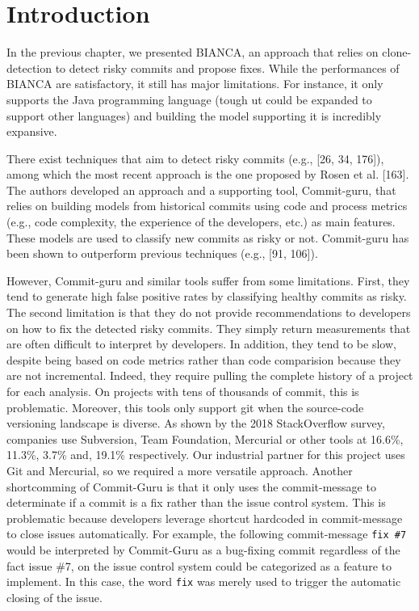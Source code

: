 \documentclass[12pt]{report}
\begin{document}
\section{Introduction}\label{introduction-4}

In the previous chapter, we presented BIANCA, an approach that relies on
clone-detection to detect risky commits and propose fixes. While the
performances of BIANCA are satisfactory, it still has major limitations.
For instance, it only supports the Java programming language (tough ut
could be expanded to support other languages) and building the model
supporting it is incredibly expansive.

There exist techniques that aim to detect risky commits (e.g., {[}26,
34, 176{]}), among which the most recent approach is the one proposed by
Rosen et al. {[}163{]}. The authors developed an approach and a
supporting tool, Commit-guru, that relies on building models from
historical commits using code and process metrics (e.g., code
complexity, the experience of the developers, etc.) as main features.
These models are used to classify new commits as risky or not.
Commit-guru has been shown to outperform previous techniques (e.g.,
{[}91, 106{]}).

However, Commit-guru and similar tools suffer from some limitations.
First, they tend to generate high false positive rates by classifying
healthy commits as risky. The second limitation is that they do not
provide recommendations to developers on how to fix the detected risky
commits. They simply return measurements that are often difficult to
interpret by developers. In addition, they tend to be slow, despite
being based on code metrics rather than code comparision because they
are not incremental. Indeed, they require pulling the complete history
of a project for each analysis. On projects with tens of thousands of
commit, this is problematic. Moreover, this tools only support git when
the source-code versioning landscape is diverse. As shown by the 2018
StackOverflow survey, companies use Subversion, Team Foundation,
Mercurial or other tools at 16.6\%, 11.3\%, 3.7\% and, 19.1\%
respectively. Our industrial partner for this project uses Git and
Mercurial, so we required a more versatile approach. Another
shortcomming of Commit-Guru is that it only uses the commit-message to
determinate if a commit is a fix rather than the issue control system.
This is problematic because developers leverage shortcut hardcoded in
commit-message to close issues automatically. For example, the following
commit-message \lstinline!fix #7! would be interpreted by Commit-Guru as
a bug-fixing commit regardless of the fact issue \#7, on the issue
control system could be categorized as a feature to implement. In this
case, the word \lstinline!fix! was merely used to trigger the automatic
closing of the issue.
\end{document}
